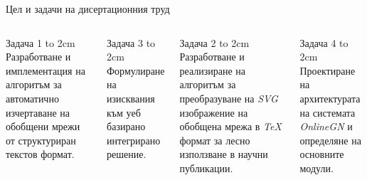 \documentclass[aspectratio=169]{beamer}
\begin{document}
\begin{frame}{Цел и задачи на дисертационния труд}
  \begin{columns}[T]
      \begin{block}{Задача 1}
        \vbox to 2cm{
          \vspace{0.1cm}
          \small Разработване и имплементация на алгоритъм за автоматично изчертаване на обобщени мрежи от структуриран текстов формат.
          \vfil
        }
      \end{block}

      \begin{block}{Задача 3}
        \vbox to 2cm{
          \vspace{0.1cm}
          \small Формулиране на изисквания към уеб базирано интегрирано решение.
          \vfil
        }
      \end{block}

          \begin{block}{Задача 2}
        \vbox to 2cm{
          \vspace{0.1cm}
          \small Разработване и реализиране на алгоритъм за преобразуване на \textit{SVG} изображение на обобщена мрежа в \textit{TeX} формат за лесно използване в научни публикации.
          \vfil
        }
      \end{block}

      \begin{block}{Задача 4}
        \vbox to 2cm{
          \vspace{0.1cm}
          \small Проектиране на архитектурата на системата \textit{OnlineGN} и определяне на основните модули.
          \vfil
        }
      \end{block}
    \end{columns}
\end{frame}
\end{document}
